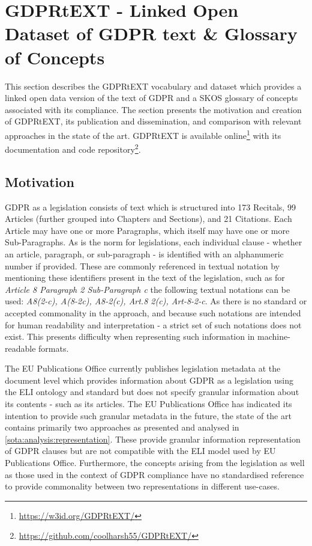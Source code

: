\section{GDPRtEXT - Linked Open Dataset of GDPR text \& Glossary of Concepts}\label{sec:voc:GDPRtEXT}

This section describes the GDPRtEXT vocabulary and dataset which provides a linked open data version of the text of GDPR and a SKOS glossary of concepts associated with its compliance. The section presents the motivation and creation of GDPRtEXT, its publication and dissemination, and comparison with relevant approaches in the state of the art. GDPRtEXT is available online\footnote{\url{https://w3id.org/GDPRtEXT/}} with its documentation and code repository\footnote{\url{https://github.com/coolharsh55/GDPRtEXT/}}.

\subsection{Motivation}
GDPR as a legislation consists of text which is structured into 173 Recitals, 99 Articles (further grouped into Chapters and Sections), and 21 Citations. Each Article may have one or more Paragraphs, which itself may have one or more Sub-Paragraphs. As is the norm for legislations, each individual clause - whether an article, paragraph, or sub-paragraph - is identified with an alphanumeric number if provided. These are commonly referenced in textual notation by mentioning these identifiers present in the text of the legislation, such as for \textit{Article 8 Paragraph 2 Sub-Paragraph c} the following textual notations can be used: \textit{A8(2-c), A(8-2c), A8-2(c), Art.8 2(c), Art-8-2-c}. As there is no standard or accepted commonality in the approach, and because such notations are intended for human readability and interpretation - a strict set of such notations does not exist. This presents difficulty when representing such information in machine-readable formats.

The EU Publications Office currently publishes legislation metadata at the document level which provides information about GDPR as a legislation using the ELI ontology and standard \cite{thomas_european_2019} but does not specify granular information about its contents - such as its articles. The EU Publications Office has indicated its intention to provide such granular metadata in the future, the state of the art contains primarily two approaches as presented and analysed in \autoref{sota:analysis:representation}. These provide granular information representation of GDPR clauses but are not compatible with the ELI model used by EU Publications Office. Furthermore, the concepts arising from the legislation as well as those used in the context of GDPR compliance have no standardised reference to provide commonality between two representations in different use-cases. 

